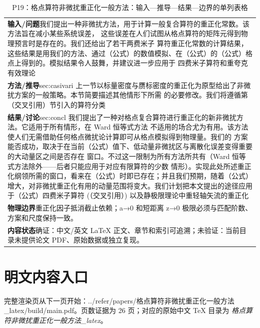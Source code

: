 \documentclass[UTF8,11pt,oneside]{ctexbook}
\begin{document}
\begin{table}[htbp]
  \centering
  \caption*{P19：格点算符非微扰重正化一般方法：输入—推导—结果—边界的单列表格}
  \small
  \begin{tabular}{@{}p{}@{}}
    \toprule
    \textbf{输入/问题}\quad 我们提出一种非微扰方法，用于计算一般复合算符的重正化常数。该方法旨在减小某些系统误差， 这些误差在人们试图从格点算符的矩阵元得到物理预言时是存在的。我们还给出了若干两费米子 算符重正化常数的计算结果，这些结果是用我们的方法、通过（公式）的数值模拟、在（公式）的（公式）格点上得到的。模拟结果令人鼓舞，并建议进一步应用于 四费米子算符和重夸克有效理论 \\
    \textbf{方法/推导}\quad sec:casivari 上一节以标量密度与赝标密度的重正化为原型给出了非微扰方案的一般策略。本节简要描述其他情形下所需 的必要修改。我们将遵循第（交叉引用）节引入的算符分类 \\
    \textbf{结果/讨论}\quad sec:concl 我们提出了一种对格点复合算符进行重正化的新非微扰方法。它适用于所有情形，在 Ward 恒等式方法 不适用的场合尤为有用。该方法使人们无需借助任何格点微扰论计算即可从格点模拟得到物理量。我们的 方案能否成功，取决于在当前（公式）值下、低动量非微扰区与离散化误差变得重要的大动量区之间是否存在 窗口。不过这一限制为所有方法所共有（Ward 恒等式方法除外——后者只能应用于对应有限算符的少数 情形）。实现此处所述重正化纲领所需的窗口，看来在（公式）时即已存在；并且我们预期，随着（公式）增大，对非微扰重正化有用的动量范围将变大。我们计划把本文提出的途径应用于（公式）四费米子算符 (（交叉引用）) 以及静极限理论中重轻轴矢流的重正化 \\
    \textbf{物理边界}\quad 重正化因子抵消截止依赖；a→0 和短距离 z→0 极限必须与匹配阶数、方案和尺度保持一致。 \\
    \textbf{内容状态}\quad 确证：中文/英文 LaTeX 正文、章节和索引可追溯；未验证：当前目录未提供论文 PDF、原始数据或独立复现。 \\
    \bottomrule
  \end{tabular}
\end{table}
\section*{明文内容入口}
\noindent 完整渲染页从下一页开始：../\allowbreak{}refer/\allowbreak{}papers/\allowbreak{}格点算符非微扰重正化一般方法\_\allowbreak{}latex/\allowbreak{}build/\allowbreak{}main.pdf。页数证据为 26 页；对应的原始中文 TeX 目录为 \emph{格点算符非微扰重正化一般方法\_latex}。
\clearpage

\clearpage
\end{document}
